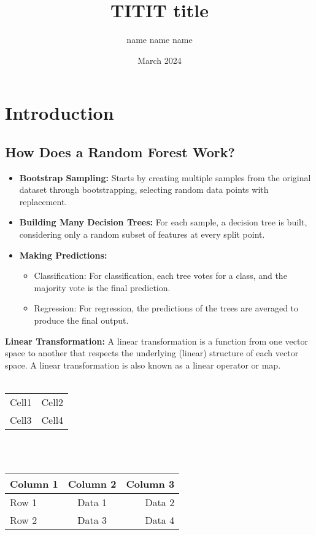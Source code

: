 \documentclass{article}
\title{TITIT title}
\author{name name name }
\date{March 2024}
\begin{document}
\maketitle

\section{Introduction}

\subsection{How Does a Random Forest Work?}

\begin{itemize}
    \item \textbf{Bootstrap Sampling:} Starts by creating multiple samples from the original dataset through bootstrapping, selecting random data points with replacement.
    \item \textbf{Building Many Decision Trees:} For each sample, a decision tree is built, considering only a random subset of features at every split point.
    \item \textbf{Making Predictions:}
    \begin{itemize}
        \item Classification: For classification, each tree votes for a class, and the majority vote is the final prediction.
        \item Regression: For regression, the predictions of the trees are averaged to produce the final output.
    \end{itemize}
\end{itemize}

\textbf{Linear Transformation:} A linear transformation is a function from one vector space to another that respects the underlying (linear) structure of each vector space. A linear transformation is also known as a linear operator or map.
\\\\
\begin{tabular}{c c}
    Cell1 & Cell2 \\
    Cell3 & Cell4 \\
\end{tabular}
\\ \\
\begin{tabular}{|l|c|r|} %
\hline %
Column 1 & Column 2 & Column 3 \\ \hline %
Row 1 & Data 1 & Data 2 \\ \hline
Row 2 & Data 3 & Data 4 \\ \hline
\end{tabular}
\\\\
\end{document}
